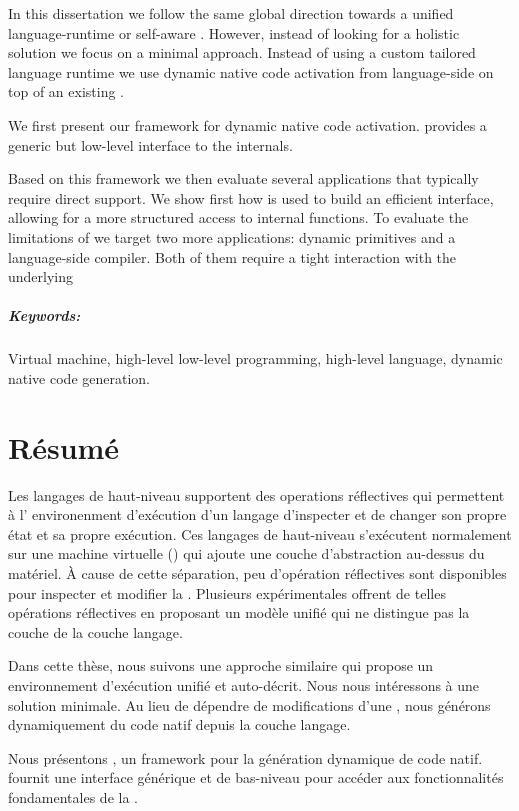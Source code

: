 \documentclass[a4paper,11pt,twoside]{include/ThesisStyle}
\begin{document}
In this dissertation we follow the same global direction towards a unified language-runtime or self-aware \VM.
However, instead of looking for a holistic solution we focus on a minimal approach.
Instead of using a custom tailored language runtime we use dynamic native code activation from language-side on top of an existing \VM.

We first present \B our framework for dynamic native code activation.
\B provides a generic but low-level interface to the \VM internals.

Based on this framework we then evaluate several applications that typically require direct \VM support.
We show first how \B is used to build an efficient \FFI interface, allowing for a more structured access to \VM internal functions.
To evaluate the limitations of \B we target two more applications: dynamic primitives and a language-side \JIT compiler.
Both of them require a tight interaction with the underlying \VM

\paragraph{Keywords:} Virtual machine, high-level low-level programming, high-level language, dynamic native code generation.

\chapter*{Résumé}
Les langages de haut-niveau supportent des operations réflectives qui permettent à l’ environenment d’exécution d’un langage d’inspecter et de changer son propre état et sa propre exécution.
Ces langages de haut-niveau s’exécutent normalement sur une machine virtuelle (\VM) qui ajoute une couche d’abstraction au-dessus du matériel.
À cause de cette séparation, peu d’opération réflectives sont disponibles pour inspecter et modifier la \VM.
Plusieurs \VMs expérimentales offrent de telles opérations réflectives en proposant un modèle unifié qui ne distingue pas la couche \VM de la couche langage. 

Dans cette thèse, nous suivons une approche similaire qui propose un environnement d’exécution unifié et auto-décrit.
Nous nous intéressons à une solution minimale.
Au lieu de dépendre de modifications d’une \VM, nous générons dynamiquement du code natif depuis la couche langage. 

Nous présentons \B, un framework pour la génération dynamique de code natif.
\B fournit une interface générique et de bas-niveau pour accéder aux fonctionnalités fondamentales de la \VM.
\end{document}
